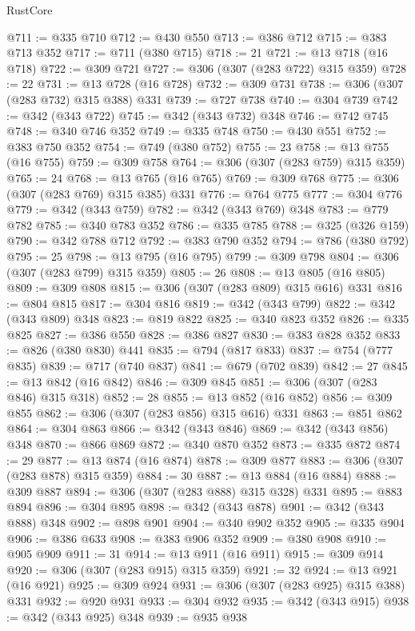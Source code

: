 \begin{lexlean}{RustCore}
\begin{coremodule}
@711 := @335 @710
@712 := @430 @550
@713 := @386 @712
@715 := @383 @713 @352
@717 := @711 (@380 @715)
@718 := 21
@721 := @13 @718 (@16 @718)
@722 := @309 @721
@727 := @306 (@307 (@283 @722) @315 @359)
@728 := 22
@731 := @13 @728 (@16 @728)
@732 := @309 @731
@738 := @306 (@307 (@283 @732) @315 @388) @331
@739 := @727 @738
@740 := @304 @739
@742 := @342 (@343 @722)
@745 := @342 (@343 @732) @348
@746 := @742 @745
@748 := @340 @746 @352
@749 := @335 @748
@750 := @430 @551
@752 := @383 @750 @352
@754 := @749 (@380 @752)
@755 := 23
@758 := @13 @755 (@16 @755)
@759 := @309 @758
@764 := @306 (@307 (@283 @759) @315 @359)
@765 := 24
@768 := @13 @765 (@16 @765)
@769 := @309 @768
@775 := @306 (@307 (@283 @769) @315 @385) @331
@776 := @764 @775
@777 := @304 @776
@779 := @342 (@343 @759)
@782 := @342 (@343 @769) @348
@783 := @779 @782
@785 := @340 @783 @352
@786 := @335 @785
@788 := @325 (@326 @159)
@790 := @342 @788 @712
@792 := @383 @790 @352
@794 := @786 (@380 @792)
@795 := 25
@798 := @13 @795 (@16 @795)
@799 := @309 @798
@804 := @306 (@307 (@283 @799) @315 @359)
@805 := 26
@808 := @13 @805 (@16 @805)
@809 := @309 @808
@815 := @306 (@307 (@283 @809) @315 @616) @331
@816 := @804 @815
@817 := @304 @816
@819 := @342 (@343 @799)
@822 := @342 (@343 @809) @348
@823 := @819 @822
@825 := @340 @823 @352
@826 := @335 @825
@827 := @386 @550
@828 := @386 @827
@830 := @383 @828 @352
@833 := @826 (@380 @830) @441
@835 := @794 (@817 @833)
@837 := @754 (@777 @835)
@839 := @717 (@740 @837)
@841 := @679 (@702 @839)
@842 := 27
@845 := @13 @842 (@16 @842)
@846 := @309 @845
@851 := @306 (@307 (@283 @846) @315 @318)
@852 := 28
@855 := @13 @852 (@16 @852)
@856 := @309 @855
@862 := @306 (@307 (@283 @856) @315 @616) @331
@863 := @851 @862
@864 := @304 @863
@866 := @342 (@343 @846)
@869 := @342 (@343 @856) @348
@870 := @866 @869
@872 := @340 @870 @352
@873 := @335 @872
@874 := 29
@877 := @13 @874 (@16 @874)
@878 := @309 @877
@883 := @306 (@307 (@283 @878) @315 @359)
@884 := 30
@887 := @13 @884 (@16 @884)
@888 := @309 @887
@894 := @306 (@307 (@283 @888) @315 @328) @331
@895 := @883 @894
@896 := @304 @895
@898 := @342 (@343 @878)
@901 := @342 (@343 @888) @348
@902 := @898 @901
@904 := @340 @902 @352
@905 := @335 @904
@906 := @386 @633
@908 := @383 @906 @352
@909 := @380 @908
@910 := @905 @909
@911 := 31
@914 := @13 @911 (@16 @911)
@915 := @309 @914
@920 := @306 (@307 (@283 @915) @315 @359)
@921 := 32
@924 := @13 @921 (@16 @921)
@925 := @309 @924
@931 := @306 (@307 (@283 @925) @315 @388) @331
@932 := @920 @931
@933 := @304 @932
@935 := @342 (@343 @915)
@938 := @342 (@343 @925) @348
@939 := @935 @938

\end{coremodule}
\end{lexlean}
